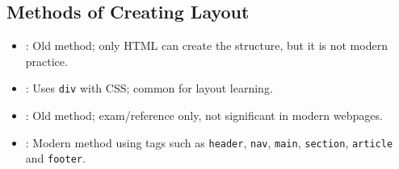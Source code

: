 \subsection{Methods of Creating Layout}
\begin{itemize}
    \item {}: Old method; only HTML can create the structure, but it is not modern practice.
    \item {}: Uses \texttt{div} with CSS; common for layout learning.
    \item {}: Old method; exam/reference only, not significant in modern webpages.
    \item {}: Modern method using tags such as \texttt{header}, \texttt{nav}, \texttt{main}, \texttt{section}, \texttt{article} and \texttt{footer}.
\end{itemize}



